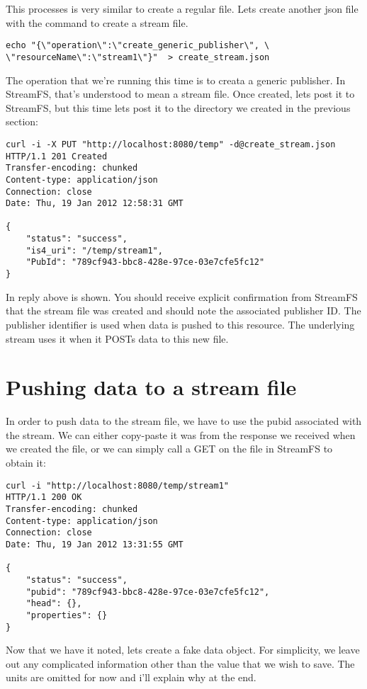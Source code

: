 This processes is very similar to create a regular file. Lets create another json file with the command to create a stream file.

\begin{lstlisting}
echo "{\"operation\":\"create_generic_publisher\", \
\"resourceName\":\"stream1\"}"  > create_stream.json
\end{lstlisting}

The operation that we're running this time is to creata a generic publisher. In StreamFS, that's understood to mean a stream file. Once created, lets post it to StreamFS, but this time lets post it to the directory we created in the previous section:

\begin{lstlisting}
curl -i -X PUT "http://localhost:8080/temp" -d@create_stream.json
HTTP/1.1 201 Created
Transfer-encoding: chunked
Content-type: application/json
Connection: close
Date: Thu, 19 Jan 2012 12:58:31 GMT

{
    "status": "success",
    "is4_uri": "/temp/stream1",
    "PubId": "789cf943-bbc8-428e-97ce-03e7cfe5fc12"
}
\end{lstlisting}

In reply above is shown. You should receive explicit confirmation from StreamFS that the stream file was created and should note the associated publisher ID. The publisher identifier is used when data is pushed to this resource. The underlying stream uses it when it POSTs data to this new file.

\section{Pushing data to a stream file}

In order to push data to the stream file, we have to use the pubid associated with the stream. We can either copy-paste it was from the response we received when we created the file, or we can simply call a GET on the file in StreamFS to obtain it:

\begin{lstlisting}
curl -i "http://localhost:8080/temp/stream1"
HTTP/1.1 200 OK
Transfer-encoding: chunked
Content-type: application/json
Connection: close
Date: Thu, 19 Jan 2012 13:31:55 GMT

{
    "status": "success",
    "pubid": "789cf943-bbc8-428e-97ce-03e7cfe5fc12",
    "head": {},
    "properties": {}
}
\end{lstlisting}

Now that we have it noted, lets create a fake data object. For simplicity, we leave out any complicated information other than the value that we wish to save. The units are omitted for now and i'll explain why at the end.


